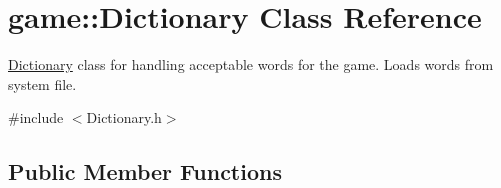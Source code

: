 \hypertarget{classgame_1_1Dictionary}{}\section{game\+:\+:Dictionary Class Reference}
\label{classgame_1_1Dictionary}


\hyperlink{classgame_1_1Dictionary}{Dictionary} class for handling acceptable words for the game. Loads words from system file.  




{\ttfamily \#include $<$Dictionary.\+h$>$}

\subsection*{Public Member Functions}
